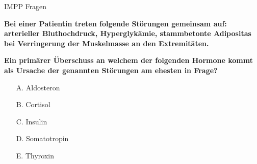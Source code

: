 \documentclass{beamer}
\begin{document}
\begin{frame}{IMPP Fragen}

\textbf{Bei einer Patientin treten folgende Störungen gemeinsam auf: arterieller Bluthochdruck, Hyperglykämie, stammbetonte Adipositas bei Verringerung der Muskelmasse an den Extremitäten.}

\textbf{Ein primärer Überschuss an welchem der folgenden Hormone kommt als Ursache der genannten Störungen am ehesten in Frage?} \\[0.2 cm]

\begin{itemize}
\item[A.] Aldosteron
\item[B.] Cortisol %
\item[C.] Insulin
\item[D.] Somatotropin
\item[E.] Thyroxin

\end{itemize}
    
\end{frame}
\end{document}
